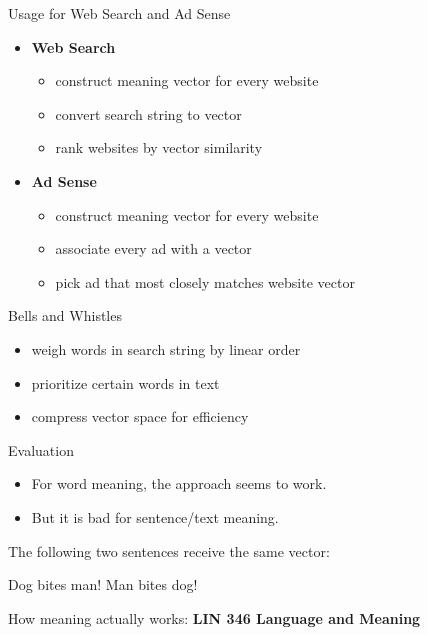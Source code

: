 \documentclass[professionalfonts, xcolor={usenames,svgnames,x11names,table}]{beamer}
\begin{document}
\begin{frame}{Usage for Web Search and Ad Sense}
    \begin{itemize}
        \item \textbf{Web Search}
            \begin{itemize}
                \item construct meaning vector for every website
                \item convert search string to vector
                \item rank websites by vector similarity
            \end{itemize}
        \item \textbf{Ad Sense}
            \begin{itemize}
                \item construct meaning vector for every website
                \item associate every ad with a vector
                \item pick ad that most closely matches website vector
            \end{itemize}
    \end{itemize}

    \begin{block}{Bells and Whistles}
        \begin{itemize}
            \item weigh words in search string by linear order\\
            \item prioritize certain words in text
            \item compress vector space for efficiency
        \end{itemize}
    \end{block}
\end{frame}

\begin{frame}{Evaluation}
    \begin{itemize}
        \item For word meaning, the approach seems to work.
        \item But it is bad for sentence/text meaning.
    \end{itemize}
    \begin{example}
        The following two sentences receive the same vector:
        \begin{exe}
            \ex
            \begin{xlist}
                \ex Dog bites man!
                \ex Man bites dog!
            \end{xlist}
        \end{exe}
    \end{example}
    \begin{followup}
        How meaning actually works: \textbf{LIN 346 Language and Meaning}
    \end{followup}
\end{frame}
\end{document}
